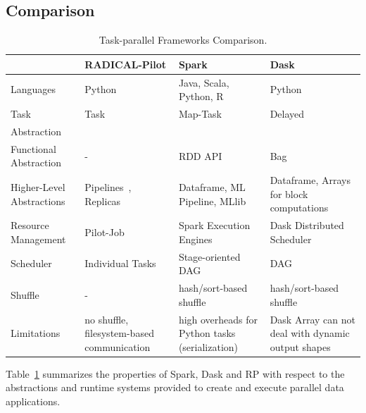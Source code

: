 \subsection{Comparison}
\begin{table}[t]
    \scriptsize
    \centering
    \begin{tabular}{@{}p{2.75cm}|p{3.25cm}p{3.25cm}p{3.25cm}@{}}
        \toprule
        &\textbf{RADICAL-Pilot} &
        \textbf{Spark} &
        \textbf{Dask} \\
        \midrule
        Languages &
        Python &
        Java, Scala, Python, R &
        Python\\
        Task &
        Task &
        Map-Task &
        Delayed\\
        Abstraction &
        &
        & \\
        Functional Abstraction  &
        - &
        RDD API &
        Bag\\
        Higher-Level Abstractions &
        Pipelines~\cite{balasubramanian2018harnessing}, Replicas~\cite{dakka2018concurrent} &
        Dataframe, ML Pipeline, MLlib~\cite{meng2016mllib} &
        Dataframe, Arrays for block computations\\
        Resource Management &
        Pilot-Job &
        Spark Execution Engines &
        Dask Distributed Scheduler\\
        Scheduler    &
        Individual Tasks &
        Stage-oriented DAG &
        DAG\\
        Shuffle      &
        -       &
        hash/sort-based shuffle &
        hash/sort-based shuffle\\
        Limitations &
        no shuffle, filesystem-based communication  &
        high overheads for Python tasks (serialization)   &
        Dask Array can not deal with dynamic output shapes\\
        \bottomrule
    \end{tabular}
    \caption{Task-parallel Frameworks Comparison.\label{tab:frameworks}}
\end{table}

Table~\ref{tab:frameworks} summarizes the properties of Spark, Dask and
RP with respect to the abstractions and runtime systems provided to
create and execute parallel data applications.

